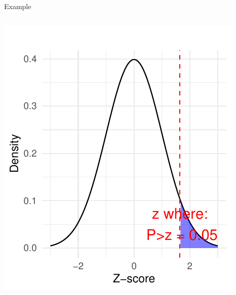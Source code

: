 \documentclass[
  ignorenonframetext,
]{beamer}
\begin{document}
\begin{frame}[fragile]{Example}
\begin{columns}[T]
\begin{column}{0.5\textwidth}
\includegraphics{M5-Hypothesis-Testing,-Probability-and-Distribution_files/figure-beamer/unnamed-chunk-20-1.pdf}
\end{column}
\end{columns}
\end{frame}
\end{document}
